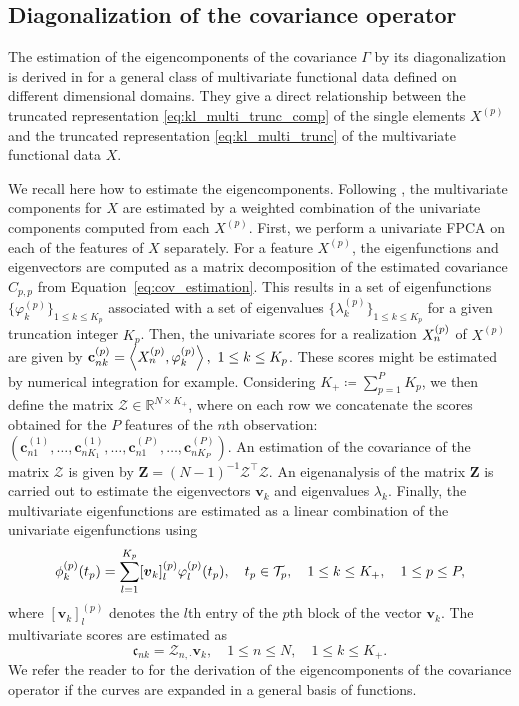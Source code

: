 \subsection{Diagonalization of the covariance operator} %
\label{sub:by_diagonalization_of_the_covariance_operator}

The estimation of the eigencomponents of the covariance $\Gamma$ by its diagonalization is derived in \cite{happMultivariateFunctionalPrincipal2018a} for a general class of multivariate functional data defined on different dimensional domains. They give a direct relationship between the truncated representation \eqref{eq:kl_multi_trunc_comp} of the single elements $X^{(p)}$ and the truncated representation \eqref{eq:kl_multi_trunc} of the multivariate functional data $X$.

We recall here how to estimate the eigencomponents. Following \citet[Prop.~5]{happMultivariateFunctionalPrincipal2018a}, the multivariate components for $X$ are estimated by a weighted combination of the univariate components computed from each $X^{(p)}$. First, we perform a univariate FPCA on each of the features of $X$ separately. For a feature $X^{(p)}$, the eigenfunctions and eigenvectors are computed as a matrix decomposition of the estimated covariance $C_{p, p}$ from Equation~\eqref{eq:cov_estimation}. This results in a set of eigenfunctions $\{\varphi_k^{(p)}\}_{1 \leq k \leq K_p}$ associated with a set of eigenvalues $\{\lambda_k^{(p)}\}_{1 \leq k \leq K_p}$ for a given truncation integer $K_p$. Then, the univariate scores for a realization $X_n^{(p)}$ of $X^{(p)}$ are given by $\mathbf{c}_{nk}^{(p)} = \left\langle X_n^{(p)}, \varphi_k^{(p)}\right\rangle, ~1 \leq k \leq K_p$. These scores might be estimated by numerical integration for example. Considering $K_+ \coloneqq \sum_{p = 1}^P K_p$, we then define the matrix $\mathcal{Z} \in \mathbb{R}^{N \times K_+}$, where on each row we concatenate the scores obtained for the $P$ features of the $n$th observation: 
$(\mathbf{c}_{n1}^{(1)}, \ldots, \mathbf{c}_{nK_1}^{(1)}, \ldots, \mathbf{c}_{n1}^{(P)}, \ldots, \mathbf{c}_{nK_P}^{(P)})$. An estimation of the covariance of the matrix $\mathcal{Z}$ is given by $\mathbf{Z} = (N - 1)^{-1}\mathcal{Z}^\top\mathcal{Z}$. An eigenanalysis of the matrix $\mathbf{Z}$ is carried out to estimate the eigenvectors $\boldsymbol{v}_k$ and eigenvalues $\lambda_k$. Finally, the multivariate eigenfunctions are estimated as a linear combination of the univariate eigenfunctions using
\begin{equation*}
\phi_k^{(p)}(t_p) = \sum_{l = 1}^{K_p}[\boldsymbol{v}_k]_{l}^{(p)}\varphi_{l}^{(p)}(t_p),\quad t_p \in \mathcal{T}_{p},\quad 1 \leq k \leq K_+,\quad 1 \leq p \leq P,
\end{equation*}
where $[\boldsymbol{v}_k]^{(p)}_{l}$ denotes the $l$th entry of the $p$th block of the vector $\boldsymbol{v}_k$. The multivariate scores are estimated as
$$\mathfrak{c}_{nk} = \mathcal{Z}_{{n,\cdot}}\boldsymbol{v}_k, \quad 1 \leq n \leq N, \quad 1 \leq k \leq K_+.$$
We refer the reader to \cite{happMultivariateFunctionalPrincipal2018a} for the derivation of the eigencomponents of the covariance operator if the curves are expanded in a general basis of functions.

